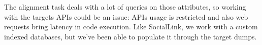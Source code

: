 The alignment task deals with a lot of queries on those attributes, so working with the targets APIs could be an issue: APIs usage is restricted and also web requests bring latency in code execution. Like SocialLink\cite{DBLP:conf/sac/NechaevCG17}, we work with a custom indexed databases, but we've been able to populate it through the target dumps.

